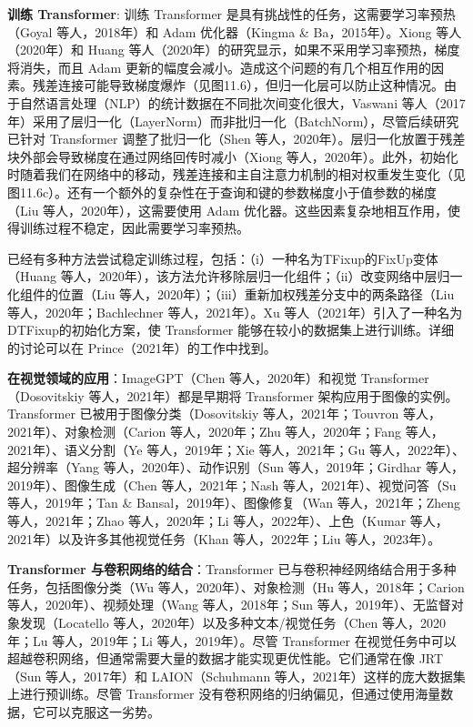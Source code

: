 \documentclass[lang=cn,newtx,10pt,scheme=chinese]{elegantbook}
\begin{document}
\textbf{训练 Transformer}: 训练 Transformer 是具有挑战性的任务，这需要学习率预热（Goyal 等人，2018年）和 Adam 优化器（Kingma \& Ba，2015年）。Xiong 等人（2020年）和 Huang 等人（2020年）的研究显示，如果不采用学习率预热，梯度将消失，而且 Adam 更新的幅度会减小。造成这个问题的有几个相互作用的因素。残差连接可能导致梯度爆炸（见图11.6），但归一化层可以防止这种情况。由于自然语言处理（NLP）的统计数据在不同批次间变化很大，Vaswani 等人（2017年）采用了层归一化（LayerNorm）而非批归一化（BatchNorm），尽管后续研究已针对 Transformer 调整了批归一化（Shen 等人，2020年）。层归一化放置于残差块外部会导致梯度在通过网络回传时减小（Xiong 等人，2020年）。此外，初始化时随着我们在网络中的移动，残差连接和主自注意力机制的相对权重发生变化（见图11.6c）。还有一个额外的复杂性在于查询和键的参数梯度小于值参数的梯度（Liu 等人，2020年），这需要使用 Adam 优化器。这些因素复杂地相互作用，使得训练过程不稳定，因此需要学习率预热。

已经有多种方法尝试稳定训练过程，包括：（i）一种名为TFixup的FixUp变体（Huang 等人，2020年），该方法允许移除层归一化组件；（ii）改变网络中层归一化组件的位置（Liu 等人，2020年）；（iii）重新加权残差分支中的两条路径（Liu 等人，2020年；Bachlechner 等人，2021年）。Xu 等人（2021年）引入了一种名为DTFixup的初始化方案，使 Transformer 能够在较小的数据集上进行训练。详细的讨论可以在 Prince（2021年）的工作中找到。

\textbf{在视觉领域的应用}：ImageGPT（Chen 等人，2020年）和视觉 Transformer（Dosovitskiy 等人，2021年）都是早期将 Transformer 架构应用于图像的实例。Transformer 已被用于图像分类（Dosovitskiy 等人，2021年；Touvron 等人，2021年）、对象检测（Carion 等人，2020年；Zhu 等人，2020年；Fang 等人，2021年）、语义分割（Ye 等人，2019年；Xie 等人，2021年；Gu 等人，2022年）、超分辨率（Yang 等人，2020年）、动作识别（Sun 等人，2019年；Girdhar 等人，2019年）、图像生成（Chen 等人，2021年；Nash 等人，2021年）、视觉问答（Su 等人，2019年；Tan \& Bansal，2019年）、图像修复（Wan 等人，2021年；Zheng 等人，2021年；Zhao 等人，2020年；Li 等人，2022年）、上色（Kumar 等人，2021年）以及许多其他视觉任务（Khan 等人，2022年；Liu 等人，2023年）。

\textbf{Transformer 与卷积网络的结合}：Transformer 已与卷积神经网络结合用于多种任务，包括图像分类（Wu 等人，2020年）、对象检测（Hu 等人，2018年；Carion 等人，2020年）、视频处理（Wang 等人，2018年；Sun 等人，2019年）、无监督对象发现（Locatello 等人，2020年）以及多种文本/视觉任务（Chen 等人，2020年；Lu 等人，2019年；Li 等人，2019年）。尽管 Transformer 在视觉任务中可以超越卷积网络，但通常需要大量的数据才能实现更优性能。它们通常在像 JRT（Sun 等人，2017年）和 LAION（Schuhmann 等人，2021年）这样的庞大数据集上进行预训练。尽管 Transformer 没有卷积网络的归纳偏见，但通过使用海量数据，它可以克服这一劣势。
\end{document}
